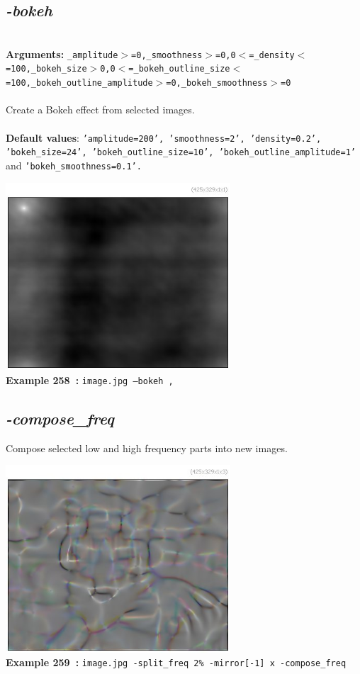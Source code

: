 \documentclass[a4paper,11pt,twoside]{book}
\begin{document}
\subsection{\emph{-bokeh} }\vspace*{-0.5em}
~\\\textbf{Arguments: } 
{\small \texttt{\_amplitude$>$=0,\_smoothness$>$=0,0$<$=\_density$<$=100,\_bokeh\_size$>$0,0$<$=\_bokeh\_outline\_size$<$=100,\_bokeh\_outline\_amplitude$>$=0,\_bokeh\_smoothness$>$=0}}\\~\\
Create a Bokeh effect from selected images.
~\\~\\\textbf{Default values}: {\small \texttt{'amplitude=200', 'smoothness=2', 'density=0.2', 'bokeh\_size=24', 'bokeh\_outline\_size=10', 'bokeh\_outline\_amplitude=1'} and \texttt{'bokeh\_smoothness=0.1'.}}
\begin{center}\includegraphics[keepaspectratio=true,height=7cm,width=\textwidth]{img/gmic_def258.jpg}\\
{\footnotesize \textbf{Example 258~:} \texttt{image.jpg --bokeh ,}}
\end{center}

\subsection{\emph{-compose\_freq} }\vspace*{-0.5em}
Compose selected low and high frequency parts into new images.
\begin{center}\includegraphics[keepaspectratio=true,height=7cm,width=\textwidth]{img/gmic_def259.jpg}\\
{\footnotesize \textbf{Example 259~:} \texttt{image.jpg -split\_freq 2\% -mirror[-1] x -compose\_freq}}
\end{center}
\end{document}
